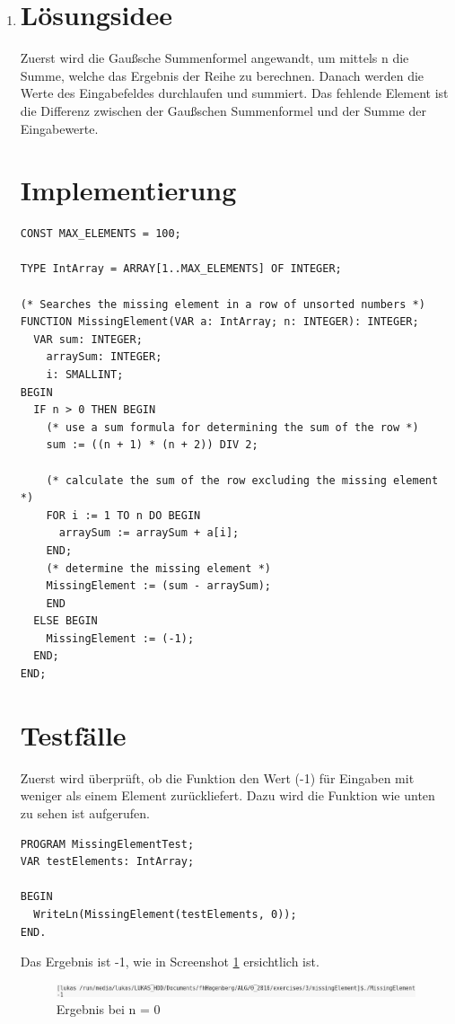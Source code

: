\documentclass[a4paper]{article}
\begin{document}
\begin{enumerate}
		\clearpage
		\item
		\section*{Lösungsidee}
		Zuerst wird die Gaußsche Summenformel angewandt, um mittels n die Summe, welche das Ergebnis der Reihe zu berechnen. Danach werden die Werte des Eingabefeldes durchlaufen und summiert. Das fehlende Element ist die Differenz zwischen der Gaußschen Summenformel und der Summe der Eingabewerte.
		
		\section*{Implementierung}
		\begin{lstlisting}[label=scMissingElement, resetmargins=true]
CONST MAX_ELEMENTS = 100;

TYPE IntArray = ARRAY[1..MAX_ELEMENTS] OF INTEGER;

(* Searches the missing element in a row of unsorted numbers *)
FUNCTION MissingElement(VAR a: IntArray; n: INTEGER): INTEGER;
  VAR sum: INTEGER;
    arraySum: INTEGER;
    i: SMALLINT;
BEGIN
  IF n > 0 THEN BEGIN
    (* use a sum formula for determining the sum of the row *)
    sum := ((n + 1) * (n + 2)) DIV 2;
    
    (* calculate the sum of the row excluding the missing element *)
    FOR i := 1 TO n DO BEGIN
      arraySum := arraySum + a[i];
    END;
    (* determine the missing element *)
    MissingElement := (sum - arraySum);
    END
  ELSE BEGIN
    MissingElement := (-1);
  END;
END;
		\end{lstlisting}
		
		\clearpage
		\section*{Testfälle}
		Zuerst wird überprüft, ob die Funktion den Wert (-1) für Eingaben mit weniger als einem Element zurückliefert. Dazu wird die Funktion wie unten zu sehen ist aufgerufen.
		\begin{lstlisting}
PROGRAM MissingElementTest;
VAR testElements: IntArray;

BEGIN	
  WriteLn(MissingElement(testElements, 0));
END.
		\end{lstlisting}
		Das Ergebnis ist -1, wie in Screenshot \ref{missingElementInvalidInput} ersichtlich ist.
		\begin{center}
			\begin{figure}[ht!]
				\includegraphics[scale=0.40]{missingElement/test/0input.png}
				\caption{Ergebnis bei n = 0}
				\label{missingElementInvalidInput}
			\end{figure}
		\end{center}
		

\end{enumerate}
\end{document}
